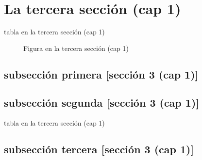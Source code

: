 \documentclass[12pt,a4paper]{report}
\begin{document}
\section{La tercera sección (cap 1)}
\begin{table}[H]
\caption{tabla en la tercera sección (cap 1)}
\end{table}
\begin{figure}[H]
\caption{Figura en la tercera sección (cap 1)}
\end{figure}
\subsection{subsección primera [sección 3 (cap 1)]}
\subsection{subsección segunda [sección 3 (cap 1)]}
\begin{table}[H]
\caption{tabla en la tercera sección (cap 1)}
\end{table}
\subsection{subsección tercera [sección 3 (cap 1)]}
\end{document}
